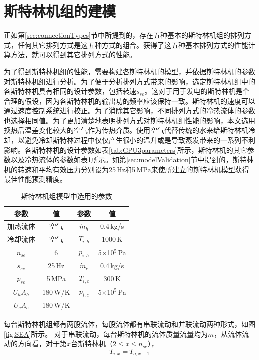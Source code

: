 \section{斯特林机组的建模}

正如第\ref{sec:connectionTypes}节中所提到的，存在五种基本的斯特林机组的排列方式，任何其它排列方式是这五种方式的组合。获得了这五种基本排列方式的性能计算方法，就可以得到其它排列方式的性能。

为了得到斯特林机组的性能，需要构建各斯特林机的模型，并依据斯特林机的参数对斯特林机组进行分析。为了便于分析排列方式带来的影响，选定斯特林机组中的各斯特林机具有相同的设计参数，包括转速$s_{se}$。这对于用于发电的斯特林机是个合理的假设，因为各斯特林机的输出功的频率应该保持一致。斯特林机的速度可以通过速度控制系统进行校正\cite{Hooshang2016}。为了消除其它影响，不同排列方式的冷热流体的参数也选择相同值。为了更加清楚地表明排列方式对斯特林机组性能的影响，本文选用换热后温差变化较大的空气作为传热介质。使用空气代替传统的水来给斯特林机冷却，以避免冷却斯特林过程中仅仅产生很小的温升或是导致蒸发带来的一系列不利影响。各斯特林机的设计参数如表\ref{tab:GPU3parameters}所示，斯特林机的其它参数以及冷热流体的参数如表\ref{tab:parameters}所示。如第\ref{sec:modelValidation}节中提到的，斯特林机的转速和平均有效压力分别设为25$\,\mathrm{Hz}$和5$\,\mathrm{MPa}$来使所建立的斯特林机模型获得最佳性能预测精度。

\begin{table}[htbp]
\setlength{\abovecaptionskip}{-10pt}
	\caption{斯特林机组模型中选用的参数}
	\begin{center}
	\begin{tabular}{cccc}
		\toprule
		参数		&	值	& 参数	&	值\\
		\midrule
		加热流体	&	空气		&	$\dot{m}_h$	&	0.4\,kg/s\\
		冷却流体	&	空气	&	$T_{i,h}$	&	1000\,K\\
		$n_{se}$	&	6	&	$p_{i,h}$	&	5$\times$10$^5$\,Pa\\
		$s_{se}$	&	25\,Hz	&	$\dot{m}_c$	&	0.4\,kg/s\\
		$p_{se}$		&	5\,MPa	&	$T_{i,c}$	&	300\,K\\
		$U_hA_h$	&	180\,W/K	&	$p_{i,c}$	&	5$\times$10$^5$\,Pa\\
		$U_cA_c$		&	180\,W/K	&&\\
		\bottomrule
	\end{tabular}
	\end{center}
	\label{tab:parameters}
\end{table}

每台斯特林机组都有两股流体，每股流体都有串联流动和并联流动两种形式，如图\ref{fig:SEA}所示。
对于串联流动，每台斯特林机的流体质量流量均为$\dot{m}$，从流体流动的方向看，对于第$x$台斯特林机（$2\leqslant{}x\leqslant{}n_{se}$），
\begin{equation}
	T_{i,x} = T_{o,x-1}
	\label{eq:T_serial}
\end{equation}

